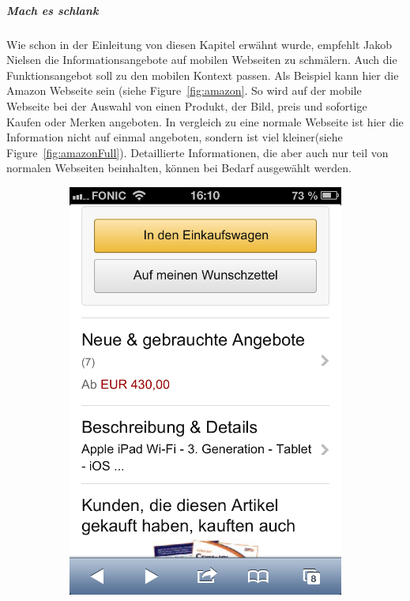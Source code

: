 \subparagraph{Mach es schlank} 
\label{subp:entferne_das_fett}

Wie schon in der Einleitung von diesen Kapitel erwähnt wurde, empfehlt Jakob Nielsen die Informationsangebote auf mobilen Webseiten zu schmälern. Auch die Funktionsangebot soll zu den mobilen Kontext passen. Als Beispiel kann hier die Amazon Webseite sein (siehe Figure~\ref{fig:amazon}. So wird auf der mobile Webseite bei der Auswahl von einen Produkt, der Bild, preis und sofortige Kaufen oder Merken angeboten. In vergleich zu eine normale Webseite ist hier die Information nicht auf einmal angeboten, sondern ist viel kleiner(siehe Figure~\ref{fig:amazonFull}). Detaillierte Informationen, die aber auch nur teil von normalen Webseiten beinhalten, können bei Bedarf ausgewählt werden. 

\begin{figure}
	\centering
	\begin{subfigure}[b]{0.3\textwidth}
		\centering
		\includegraphics[width=1\textwidth]{img/amazon.png}

\end{subfigure}
\end{figure}
